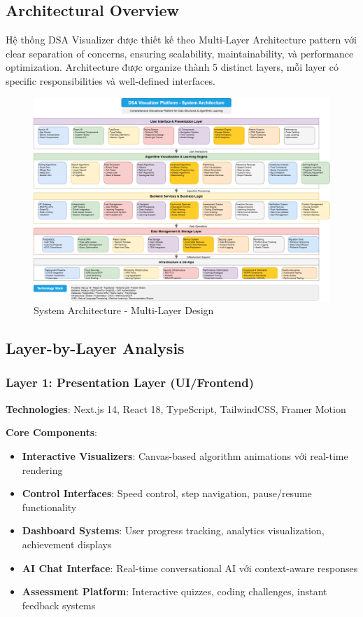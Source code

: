 \subsection{Architectural Overview}
\label{subsec:architecture-overview}

Hệ thống DSA Visualizer được thiết kế theo Multi-Layer Architecture pattern với clear separation of concerns, ensuring scalability, maintainability, và performance optimization. Architecture được organize thành 5 distinct layers, mỗi layer có specific responsibilities và well-defined interfaces.

\begin{figure}[H]
\centering
\includegraphics[width=1.0\textwidth]{enhanced-diagrams/system-architecture-clean.png}
\caption{System Architecture - Multi-Layer Design}
\label{fig:system-architecture}
\end{figure}

\subsection{Layer-by-Layer Analysis}
\label{subsec:layer-analysis}

\subsubsection{Layer 1: Presentation Layer (UI/Frontend)}

\textbf{Technologies}: Next.js 14, React 18, TypeScript, TailwindCSS, Framer Motion

\textbf{Core Components}:
\begin{itemize}
    \item \textbf{Interactive Visualizers}: Canvas-based algorithm animations với real-time rendering
    \item \textbf{Control Interfaces}: Speed control, step navigation, pause/resume functionality
    \item \textbf{Dashboard Systems}: User progress tracking, analytics visualization, achievement displays
    \item \textbf{AI Chat Interface}: Real-time conversational AI với context-aware responses
    \item \textbf{Assessment Platform}: Interactive quizzes, coding challenges, instant feedback systems
\end{itemize}

